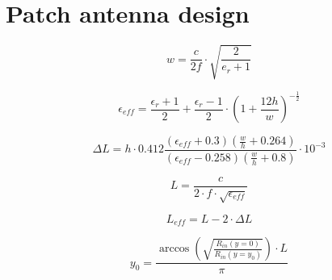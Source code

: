 \chapter{Patch antenna design}


\begin{equation}
w = \frac{c}{2f} \cdot \sqrt{\frac{2}{ e_{r}+1}}
\end{equation}

\begin{equation}
\epsilon_{eff} = \frac{\epsilon_{r}+1}{2} +\frac{\epsilon_{r}-1}{2}\cdot\left(1+\frac{12h}{w}\right)^{-\frac{1}{2}}
\end{equation}

\begin{equation}
\Delta L = h\cdot0.412 \frac{(\epsilon_{eff}+0.3)\left(\frac{w}{h}+0.264\right)}{(\epsilon_{eff}-0.258)\left(\frac{w}{h}+0.8\right)}\cdot 10^{-3}
\end{equation}

\begin{equation}
L = \frac{c}{2\cdot f\cdot\sqrt{\epsilon_{eff}}}
\end{equation}

\begin{equation}
L_{eff} = L-2\cdot\Delta L
\end{equation}

\begin{equation}
y_0 = \frac{\arccos\left(\sqrt{\frac{R_{in}(y=0)}{R_{in}(y=y_0)}}\right)\cdot L}{\pi}
\end{equation}











